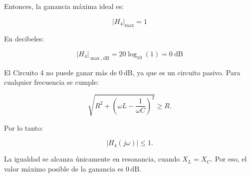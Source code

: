 Entonces, la ganancia máxima ideal es:

\begin{equation}
    \boxed{
    |H_4|_{\max}=1
    }
\end{equation}

En decibeles:

\begin{equation}
    \boxed{
    |H_4|_{\max,\mathrm{dB}}
    =
    20\log_{10}(1)
    =
    0\ \mathrm{dB}
    }
\end{equation}

El Circuito 4 no puede ganar más de \(0\,\mathrm{dB}\), ya que es un circuito pasivo. Para cualquier frecuencia se cumple:

\begin{equation}
    \sqrt{
    R^2+
    \left(\omega L-\frac{1}{\omega C}\right)^2
    }
    \ge R.
\end{equation}

Por lo tanto:

\begin{equation}
    |H_4(j\omega)|\le 1.
\end{equation}

La igualdad se alcanza únicamente en resonancia, cuando \(X_L=X_C\). Por eso, el valor máximo posible de la ganancia es \(0\,\mathrm{dB}\).
